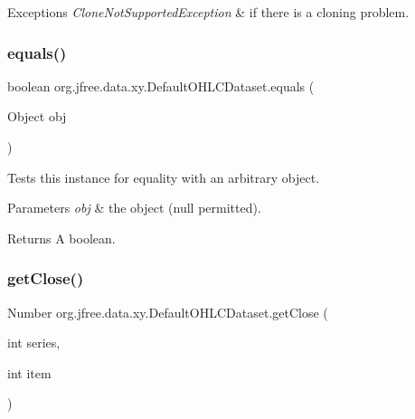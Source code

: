 \begin{DoxyExceptions}{Exceptions}
{\em Clone\+Not\+Supported\+Exception} & if there is a cloning problem. \\
\hline
\end{DoxyExceptions}
\mbox{\label{classorg_1_1jfree_1_1data_1_1xy_1_1_default_o_h_l_c_dataset_add2f8e277ddac5fb19ff0f3a49122cbc}} 
\subsubsection{\texorpdfstring{equals()}{equals()}}
{\footnotesize\ttfamily boolean org.\+jfree.\+data.\+xy.\+Default\+O\+H\+L\+C\+Dataset.\+equals (\begin{DoxyParamCaption}\item[{Object}]{obj }\end{DoxyParamCaption})}

Tests this instance for equality with an arbitrary object.


\begin{DoxyParams}{Parameters}
{\em obj} & the object ({\ttfamily null} permitted).\\
\hline
\end{DoxyParams}
\begin{DoxyReturn}{Returns}
A boolean. 
\end{DoxyReturn}
\mbox{\label{classorg_1_1jfree_1_1data_1_1xy_1_1_default_o_h_l_c_dataset_afca93f709f3d421a3d57b67e00357b03}} 
\subsubsection{\texorpdfstring{get\+Close()}{getClose()}}
{\footnotesize\ttfamily Number org.\+jfree.\+data.\+xy.\+Default\+O\+H\+L\+C\+Dataset.\+get\+Close (\begin{DoxyParamCaption}\item[{int}]{series,  }\item[{int}]{item }\end{DoxyParamCaption})}

